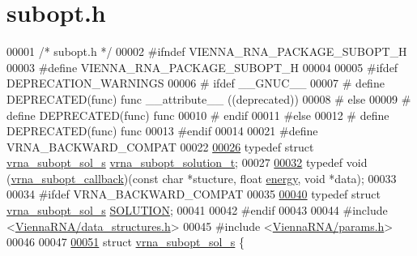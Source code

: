 \hypertarget{subopt_8h_source}{}\section{subopt.\+h}
\label{subopt_8h_source}

\begin{DoxyCode}
00001 \textcolor{comment}{/* subopt.h */}
00002 \textcolor{preprocessor}{#ifndef VIENNA\_RNA\_PACKAGE\_SUBOPT\_H}
00003 \textcolor{preprocessor}{#define VIENNA\_RNA\_PACKAGE\_SUBOPT\_H}
00004 
00005 \textcolor{preprocessor}{#ifdef DEPRECATION\_WARNINGS}
00006 \textcolor{preprocessor}{# ifdef \_\_GNUC\_\_}
00007 \textcolor{preprocessor}{#  define DEPRECATED(func) func \_\_attribute\_\_ ((deprecated))}
00008 \textcolor{preprocessor}{# else}
00009 \textcolor{preprocessor}{#  define DEPRECATED(func) func}
00010 \textcolor{preprocessor}{# endif}
00011 \textcolor{preprocessor}{#else}
00012 \textcolor{preprocessor}{# define DEPRECATED(func) func}
00013 \textcolor{preprocessor}{#endif}
00014 
00021 \textcolor{preprocessor}{#define VRNA\_BACKWARD\_COMPAT}
00022 
\hypertarget{subopt_8h_source.tex_l00026}{}\hyperlink{subopt_8h_a01ae9a0f27d245d89f705afd843fc457}{00026} \textcolor{keyword}{typedef} \textcolor{keyword}{struct }\hyperlink{structvrna__subopt__sol__s}{vrna\_subopt\_sol\_s}   \hyperlink{structvrna__subopt__sol__s}{vrna\_subopt\_solution\_t};
00027 
\hypertarget{subopt_8h_source.tex_l00032}{}\hyperlink{group__subopt__wuchty_ga226e3803a826aba8159284d021c24d01}{00032} \textcolor{keyword}{typedef} void (\hyperlink{group__subopt__wuchty_ga226e3803a826aba8159284d021c24d01}{vrna\_subopt\_callback})(\textcolor{keyword}{const} \textcolor{keywordtype}{char} *stucture, \textcolor{keywordtype}{float} 
      \hyperlink{structvrna__subopt__sol__s_a99bc26ca68392aa4656386cf73b73fef}{energy}, \textcolor{keywordtype}{void} *data);
00033 
00034 \textcolor{preprocessor}{#ifdef VRNA\_BACKWARD\_COMPAT}
00035 
\hypertarget{subopt_8h_source.tex_l00040}{}\hyperlink{subopt_8h_aa0f46ff02e1017469cf902d02ecd7f9a}{00040} \textcolor{keyword}{typedef} \textcolor{keyword}{struct }\hyperlink{structvrna__subopt__sol__s}{vrna\_subopt\_sol\_s}   \hyperlink{structvrna__subopt__sol__s}{SOLUTION};
00041 
00042 \textcolor{preprocessor}{#endif}
00043 
00044 \textcolor{preprocessor}{#include <\hyperlink{data__structures_8h}{ViennaRNA/data\_structures.h}>}
00045 \textcolor{preprocessor}{#include <\hyperlink{params_8h}{ViennaRNA/params.h}>}
00046 
00047 
\hypertarget{subopt_8h_source.tex_l00051}{}\hyperlink{structvrna__subopt__sol__s}{00051} \textcolor{keyword}{struct }\hyperlink{structvrna__subopt__sol__s}{vrna\_subopt\_sol\_s} \{

\end{DoxyCode}
